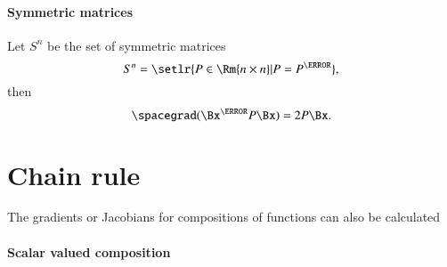 \paragraph{Symmetric matrices}

Let \( S^n \) be the set of symmetric matrices
%
\begin{equation}\label{eqn:jacobianAndHessian:444}
S^n = \setlr{ P \in \Rm{n\times n} | P = P^\T},
\end{equation}
%
then
%
\begin{equation}\label{eqn:jacobianAndHessian:464}
\spacegrad (\Bx^\T P \Bx) = 2 P \Bx.
\end{equation}
%
\section{Chain rule}

The gradients or Jacobians for compositions of functions can also be calculated


\paragraph{Scalar valued composition}

